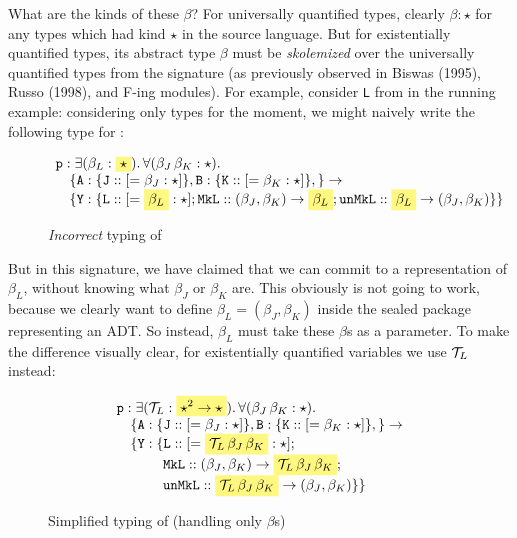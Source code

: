 \documentclass{article}
\begin{document}
What are the kinds of these $\beta$?  For universally quantified types,
clearly $\beta : \star$ for any types which
had kind $\star$ in the source language.  But for existentially quantified
types, its abstract
type $\beta$ must be \emph{skolemized} over the universally
quantified types from the signature (as previously observed in Biswas
(1995), Russo (1998), and F-ing modules).  For example, consider
\texttt{L} from  in the running example:  considering
only types for the moment, we might naively write the following type for :

\begin{figure}[H]
\[
\begin{array}{l}
\cidl{p} : \exists (\beta_L : \highlight{\star}).\, \forall (\beta_J\, \beta_K : \star).\, \\
    \quad \{
     \modname{A} :
        \{ \mathtt{J} :: [= \beta_J : \star] \},
     \modname{B} :
        \{ \mathtt{K} :: [= \beta_K : \star] \},
    \}
    \rightarrow \\
    \quad \{
     \modname{Y} :
        \{ \mathtt{L} :: [= \highlight{\beta_L} : \star ]
         ; \mathtt{MkL} :: (\beta_J, \beta_K) \rightarrow \highlight{\beta_L}
         ; \mathtt{unMkL} :: \highlight{\beta_L} \rightarrow (\beta_J, \beta_K)

         \}
    \}
\end{array}
\]
\caption{\emph{Incorrect} typing of }
\end{figure}

\noindent
But in this signature, we have claimed that we can commit to
a representation of $\beta_L$, without knowing what $\beta_J$
or $\beta_K$ are.  This obviously is not going to work,
because we clearly want to define $\beta_L = (\beta_J, \beta_K)$
inside the sealed package representing an ADT\@.  So instead, $\beta_L$
must take these $\beta$s as a parameter.  To make the difference
visually clear, for existentially quantified variables we use
$\mathcal{T}_L$ instead:

\begin{figure}[H]
\[
\begin{array}{l}
\cidl{p} : \exists (\CT_L : \highlight{\star^2 \rightarrow \star}).\, \forall (\beta_J\, \beta_K : \star).\, \\
    \quad \{
     \modname{A} :
        \{ \mathtt{J} :: [= \beta_J : \star] \},
     \modname{B} :
        \{ \mathtt{K} :: [= \beta_K : \star] \},
    \}
    \rightarrow \\
    \quad \{
     \modname{Y} :
        \{ \mathtt{L} :: [= \highlight{\CT_L\, \beta_J\, \beta_K} : \star]; \\
\qquad\quad~ \mathtt{MkL} :: (\beta_J, \beta_K) \rightarrow \highlight{\CT_L\, \beta_J\, \beta_K}; \\

\qquad\quad~ \mathtt{unMkL} :: \highlight{\CT_L\, \beta_J\, \beta_K} \rightarrow (\beta_J, \beta_K)
           \}
    \}
\end{array}
\]
\caption{Simplified typing of  (handling only $\beta$s)}
\end{figure}
\end{document}
